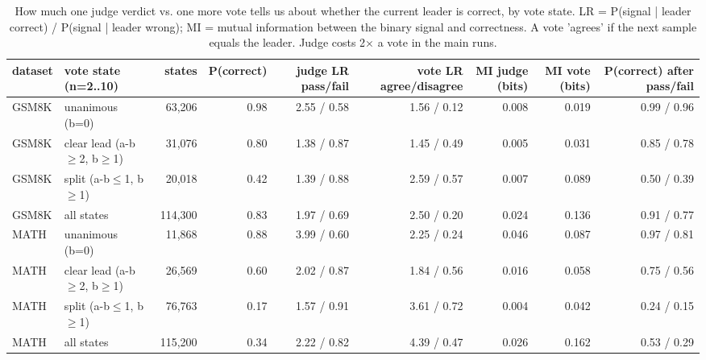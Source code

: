 \begin{table}[t]
\centering
\small
\caption{How much one judge verdict vs. one more vote tells us about whether the current leader is correct, by vote state. LR = P(signal | leader correct) / P(signal | leader wrong); MI = mutual information between the binary signal and correctness. A vote 'agrees' if the next sample equals the leader. Judge costs 2× a vote in the main runs.}
\label{tab:judge_informativeness}
\begin{tabular}{llrrrrrrr}
\toprule
dataset & vote state (n=2..10) & states & P(correct) & judge LR pass/fail & vote LR agree/disagree & MI judge (bits) & MI vote (bits) & P(correct) after pass/fail \\
\midrule
GSM8K & unanimous (b=0) & 63,206 & 0.98 & 2.55 / 0.58 & 1.56 / 0.12 & 0.008 & 0.019 & 0.99 / 0.96 \\
GSM8K & clear lead (a-b$\geq$2, b$\geq$1) & 31,076 & 0.80 & 1.38 / 0.87 & 1.45 / 0.49 & 0.005 & 0.031 & 0.85 / 0.78 \\
GSM8K & split (a-b$\leq$1, b$\geq$1) & 20,018 & 0.42 & 1.39 / 0.88 & 2.59 / 0.57 & 0.007 & 0.089 & 0.50 / 0.39 \\
GSM8K & all states & 114,300 & 0.83 & 1.97 / 0.69 & 2.50 / 0.20 & 0.024 & 0.136 & 0.91 / 0.77 \\
MATH & unanimous (b=0) & 11,868 & 0.88 & 3.99 / 0.60 & 2.25 / 0.24 & 0.046 & 0.087 & 0.97 / 0.81 \\
MATH & clear lead (a-b$\geq$2, b$\geq$1) & 26,569 & 0.60 & 2.02 / 0.87 & 1.84 / 0.56 & 0.016 & 0.058 & 0.75 / 0.56 \\
MATH & split (a-b$\leq$1, b$\geq$1) & 76,763 & 0.17 & 1.57 / 0.91 & 3.61 / 0.72 & 0.004 & 0.042 & 0.24 / 0.15 \\
MATH & all states & 115,200 & 0.34 & 2.22 / 0.82 & 4.39 / 0.47 & 0.026 & 0.162 & 0.53 / 0.29 \\
\bottomrule
\end{tabular}
\end{table}
